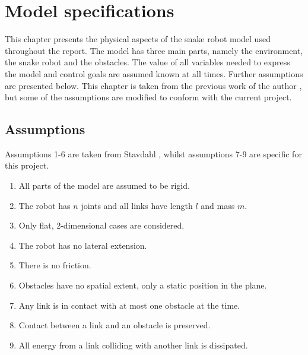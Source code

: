 \chapter{Model specifications} \label{ch:model_specs}

This chapter presents the physical aspects of the snake robot model used throughout the report. The model has three main parts, namely the environment, the snake robot and the obstacles. The value of all variables needed to express the model and control goals are assumed known at all times. Further assumptions are presented below. This chapter is taken from the previous work of the author \cite{AtussaProsjektoppgp}, but some of the assumptions are modified to conform with the current project.

\section{Assumptions}\label{seq:assumptions}

Assumptions 1-6 are taken from Stavdahl \cite{StavdahlNote}, whilst assumptions 7-9 are specific for this project.

\begin{enumerate}
    \item All parts of the model are assumed to be rigid.
    \item The robot has $n$ joints and all links have length $l$ and mass $m$.
    \item Only flat, 2-dimensional cases are considered.
    \item The robot has no lateral extension.
    \item There is no friction. 
    \item Obstacles have no spatial extent, only a static position in the plane.
    \item Any link is in contact with at most one obstacle at the time.
    \item Contact between a link and an obstacle is preserved.
    \item All energy from a link colliding with another link is dissipated.
\end{enumerate}



